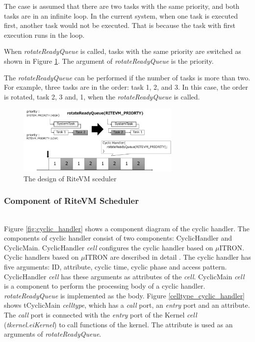 \documentclass[conference,compsoc]{IEEEtran}
\begin{document}
The case is assumed that there are two tasks with the same priority, and both tasks are in an infinite loop.
In the current system, when one task is executed first, another task would not be executed.
That is because the task with first execution runs in the loop.

When {\it rotateReadyQueue} is called, tasks with the same priority are switched as shown in Figure \ref{fig:rotateReadyQueue}.
The argument of {\it rotateReadyQueue} is the priority.

The {\it rotateReadyQueue} can be performed if the number of tasks is more than two.
For example, three tasks are in the order: task 1, 2, and 3.
In this case, the order is rotated, task 2, 3 and, 1, when the {\it rotateReadyQueue} is called.

\begin{figure}[t]
    \centering
    \includegraphics[width=8cm,clip]{figure/rotateReadyQueue.pdf}
    \caption{The design of RiteVM sceduler}
    \label{fig:rotateReadyQueue}
\end{figure} 

\subsubsection{Component of RiteVM Scheduler} \mbox{}\\

Figure \ref{fig:cyclic_handler} shows a component diagram of the cyclic handler.
The components of cyclic handler consist of two components: CyclicHandler and CyclicMain.
CyclicHandler {\it cell} configures the cyclic handler based on $\mu$ITRON.
Cyclic handlers based on $\mu$ITRON are described in detail \cite{par:microITRON}.
The cyclic handler has five arguments: ID, attribute, cyclic time, cyclic phase and access pattern.
CyclicHandler {\it cell} has these arguments as attributes of the {\it cell}.
CyclicMain {\it cell} is a component to perform the processing body of a cyclic handler.
{\it rotateReadyQueue} is implemented as the body.
Figure \ref{celltype_cyclic_handler} shows tCyclicMain {\it celltype}, which has a {\it call} port, an {\it entry} port and an attribute.
The {\it call} port is connected with the {\it entry} port of the Kernel {\it cell} ({\it tkernel.eiKernel}) to call functions of the kernel. 
The attribute is used as an arguments of {\it rotateReadyQueue}.
\end{document}

